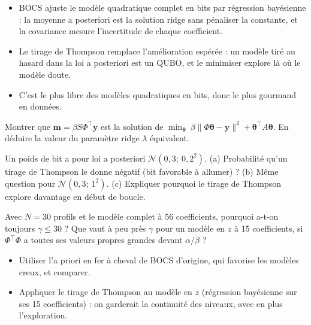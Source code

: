 \begin{resultat}
\begin{itemize}
\item BOCS ajuste le modèle quadratique complet en bits par régression bayésienne : la moyenne a posteriori est la solution ridge sans pénaliser la constante, et la covariance mesure l'incertitude de chaque coefficient.
\item Le tirage de Thompson remplace l'amélioration espérée : un modèle tiré au hasard dans la loi a posteriori est un QUBO, et le minimiser explore là où le modèle doute.
\item C'est le plus libre des modèles quadratiques en bits, donc le plus gourmand en données.
\end{itemize}
\end{resultat}

\exercices
\begin{exercice}\label{ex:bocs-ridge}
Montrer que $\mathbf m=\beta S\Phi^\top\mathbf y$ est la solution de $\min_{\boldsymbol\theta}\ \beta\|\Phi\boldsymbol\theta-\mathbf y\|^2+\boldsymbol\theta^\top A\boldsymbol\theta$. En déduire la valeur du paramètre ridge $\lambda$ équivalent.
\end{exercice}
\begin{exercice}\label{ex:thompson}
Un poids de bit a pour loi a posteriori $\mathcal N(0{,}3;\ 0{,}2^2)$. (a) Probabilité qu'un tirage de Thompson le donne négatif (bit favorable à allumer) ? (b) Même question pour $\mathcal N(0{,}3;\ 1^2)$. (c) Expliquer pourquoi le tirage de Thompson explore davantage en début de boucle.
\end{exercice}
\begin{exercice}\label{ex:gamma}
Avec $N=30$ profils et le modèle complet à 56 coefficients, pourquoi a-t-on toujours $\gamma\le30$ ? Que vaut à peu près $\gamma$ pour un modèle en $z$ à 15 coefficients, si $\Phi^\top\Phi$ a toutes ses valeurs propres grandes devant $\alpha/\beta$ ?
\end{exercice}

\begin{pistes}
\begin{itemize}
\item Utiliser l'a priori en fer à cheval de BOCS d'origine, qui favorise les modèles creux, et comparer.
\item Appliquer le tirage de Thompson au modèle en $z$ (régression bayésienne sur ses 15 coefficients) : on garderait la continuité des niveaux, avec en plus l'exploration.
\end{itemize}
\end{pistes}
